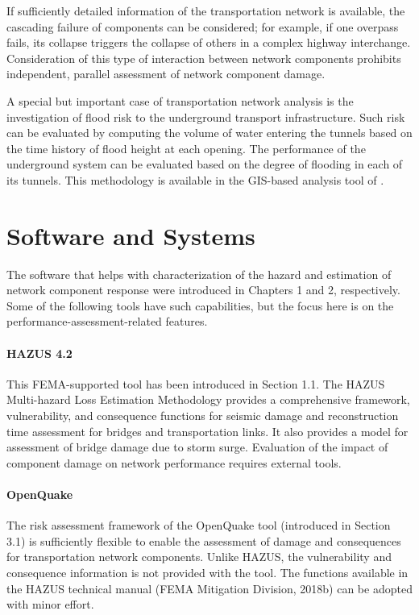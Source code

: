 If sufficiently detailed information of the transportation network is available, the cascading failure of components can be considered; for example, if one overpass fails, its collapse triggers the collapse of others in a complex highway interchange. Consideration of this type of interaction between network components prohibits independent, parallel assessment of network component damage.

A special but important case of transportation network analysis is the investigation of flood risk to the underground transport infrastructure. Such risk can be evaluated by computing the volume of water entering the tunnels based on the time history of flood height at each opening. The performance of the underground system can be evaluated based on the degree of flooding in each of its tunnels. This methodology is available in the GIS-based analysis tool of \cite{jacob2011responding}.

\section{Software and Systems}
\label{sec:perf_transport_tools}

The software that helps with characterization of the hazard and estimation of network component response were introduced in Chapters 1 and 2, respectively. Some of the following tools have such capabilities, but the focus here is on the performance-assessment-related features.

\paragraph{HAZUS 4.2} This FEMA-supported tool has been introduced in Section 1.1. The HAZUS Multi-hazard Loss Estimation Methodology provides a comprehensive framework, vulnerability, and consequence functions for seismic damage and reconstruction time assessment for bridges and transportation links. It also provides a model for assessment of bridge damage due to storm surge. Evaluation of the impact of component damage on network performance requires external tools.

\paragraph{OpenQuake} The risk assessment framework of the OpenQuake tool (introduced in Section 3.1) is sufficiently flexible to enable the assessment of damage and consequences for transportation network components. Unlike HAZUS, the vulnerability and consequence information is not provided with the tool. The functions available in the HAZUS technical manual (FEMA Mitigation Division, 2018b) can be adopted with minor effort.

